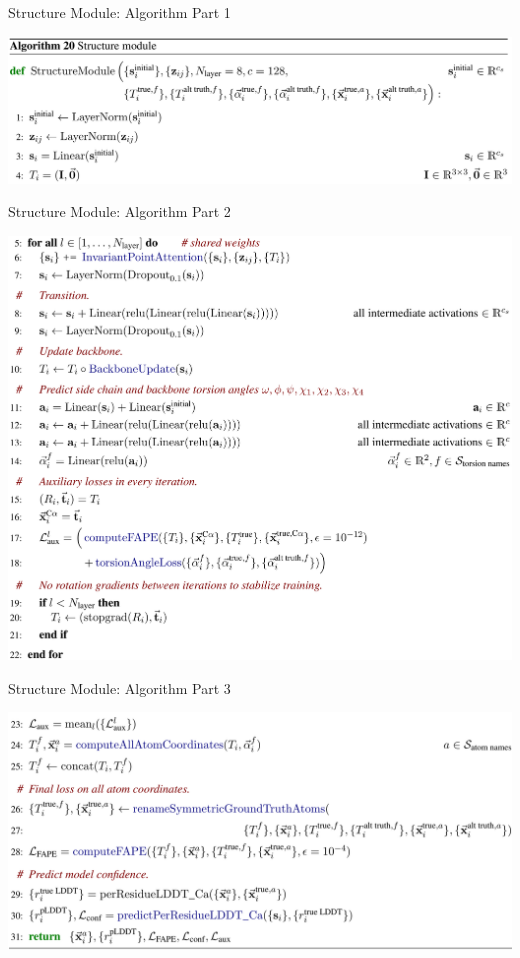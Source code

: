 \documentclass[presentation, smaller]{beamer}
\begin{document}
\begin{frame}[label={sec:orgce5c2ff}]{Structure Module: Algorithm Part 1 \cite{jumperHighlyAccurateProtein2021}}
\begin{center}
\includegraphics[width=.9\linewidth]{./imgs/algo20-part1.png}
\end{center}
\end{frame}

\begin{frame}[label={sec:orgc596ef0}]{Structure Module: Algorithm Part 2 \cite{jumperHighlyAccurateProtein2021}}
\begin{center}
\includegraphics[width=.9\linewidth]{./imgs/algo20-part2.png}
\end{center}
\end{frame}

\begin{frame}[label={sec:org59bdb33}]{Structure Module: Algorithm Part 3 \cite{jumperHighlyAccurateProtein2021}}
\begin{center}
\includegraphics[width=.9\linewidth]{./imgs/algo20-part3.png}
\end{center}
\end{frame}
\end{document}
